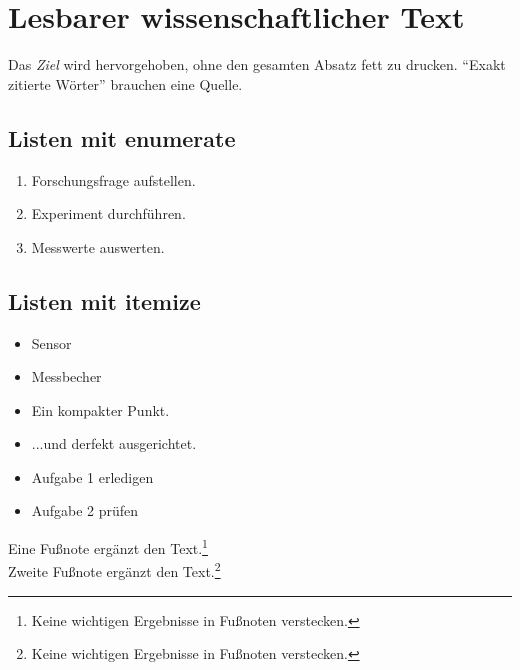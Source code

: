 \documentclass{scrartcl}
\begin{document}
\section{Lesbarer wissenschaftlicher Text}
Das \emph{Ziel} wird hervorgehoben, ohne den gesamten Absatz fett zu drucken.
\newline
\enquote{Exakt zitierte Wörter} brauchen eine Quelle.

\subsection{Listen mit enumerate}
\begin{enumerate}
  \item Forschungsfrage aufstellen.
  \item Experiment durchführen.
  \item Messwerte auswerten.
\end{enumerate}

\subsection{Listen mit itemize}
\begin{itemize}
	
  \item Sensor
  \item Messbecher
\end{itemize}

\begin{itemize}[label=\textendash, nosep, leftmargin=*]
	\item Ein kompakter Punkt.
	\item ...und derfekt ausgerichtet.
\end{itemize}

\begin{itemize}[label=$\square$, itemsep=1ex] %
	\item Aufgabe 1 erledigen
	\item Aufgabe 2 prüfen
\end{itemize}


Eine Fußnote ergänzt den Text.\footnote{Keine wichtigen Ergebnisse in Fußnoten verstecken.}\\
Zweite Fußnote ergänzt den Text.\footnote{Keine wichtigen Ergebnisse in Fußnoten verstecken.}
\end{document}
